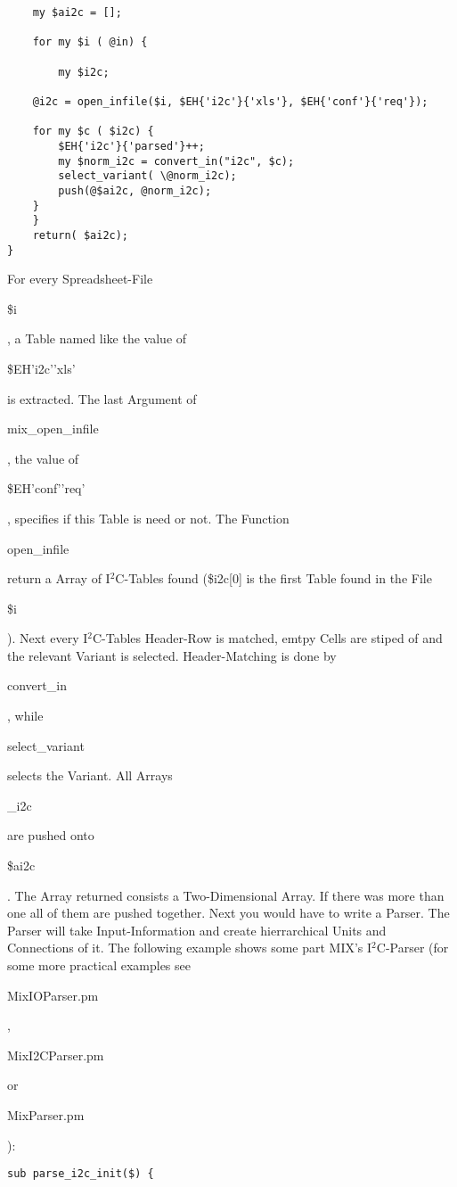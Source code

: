 \documentclass[a4paper,12pt]{article}
\begin{document}
{\begin{verbatim}
    my $ai2c = [];

    for my $i ( @in) {
     
        my $i2c;

	@i2c = open_infile($i, $EH{'i2c'}{'xls'}, $EH{'conf'}{'req'});

	for my $c ( $i2c) {
	    $EH{'i2c'}{'parsed'}++;
	    my $norm_i2c = convert_in("i2c", $c);
	    select_variant( \@norm_i2c);
	    push(@$ai2c, @norm_i2c);
	}
    }
    return( $ai2c);
}
\end{verbatim}
For every Spreadsheet-File \begin{tt}\$i\end{tt}, a Table named like the value of \begin{tt}\$EH{'i2c'}{'xls'}\end{tt} is extracted. The last Argument of \begin{tt}mix\_open\_infile\end{tt}, the value of\begin{tt}\$EH{'conf'}{'req'}\end{tt}, specifies if this Table is need or not. The Function \begin{tt}open\_infile\end{tt} return a Array of I$^2$C-Tables found (\$i2c[0] is the first Table found in the File \begin{tt}\$i\end{tt}). Next every I$^2$C-Tables Header-Row is matched, emtpy Cells are stiped of and the relevant Variant is selected. Header-Matching is done by \begin{tt}convert\_in\end{tt}, while \begin{tt}select\_variant\end{tt} selects the Variant. All Arrays \begin{tt}\@norm\_i2c\end{tt} are pushed onto \begin{tt}\@\$ai2c\end{tt}. The Array returned consists a Two-Dimensional Array. If there was more than one all of them are pushed together.\newline
Next you would have to write a Parser. The Parser will take Input-Information and create hierrarchical Units and Connections of it. The following example shows some part MIX's I$^2$C-Parser (for some more practical examples see \begin{tt}MixIOParser.pm\end{tt}, \begin{tt}MixI2CParser.pm\end{tt} or \begin{tt}MixParser.pm\end{tt}):
\begin{verbatim}
sub parse_i2c_init($) {


\end{verbatim}}
\end{document}
